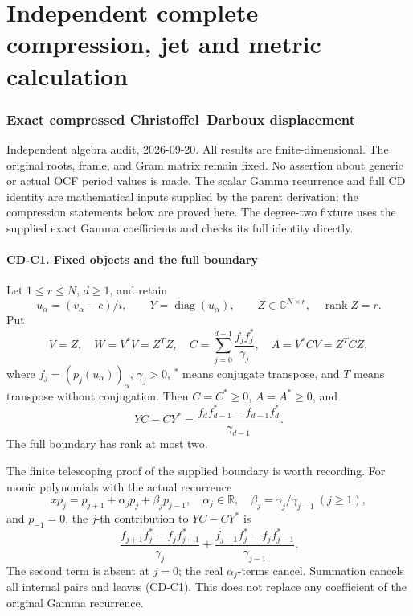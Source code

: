 \documentclass[11pt]{article}
\begin{document}
\endgroup

\clearpage\begingroup
\part*{Independent complete compression, jet and metric calculation}
\providecommand{\cdaudittightlist}{\setlength{\itemsep}{0pt}\setlength{\parskip}{0pt}}

\section{Exact compressed Christoffel--Darboux displacement}\label{cdaudit:exact-compressed-christoffeldarboux-displacement}

Independent algebra audit, 2026-09-20. All results are finite-dimensional. The original roots, frame, and Gram matrix remain fixed. No assertion about generic or actual OCF period values is made. The scalar Gamma recurrence and full CD identity are mathematical inputs supplied by the parent derivation; the compression statements below are proved here. The degree-two fixture uses the supplied exact Gamma coefficients and checks its full identity directly.

\subsection{CD-C1. Fixed objects and the full boundary}\label{cdaudit:cd-c1.-fixed-objects-and-the-full-boundary}

Let \(1\le r\le N\), \(d\ge1\), and retain \[
u_\alpha=(v_\alpha-c)/i,\qquad Y=\operatorname{diag}(u_\alpha),\qquad
Z\in\mathbb C^{N\times r},\quad \operatorname{rank}Z=r.
\] Put \[
V=\overline Z,\quad W=V^*V=Z^T\overline Z,\quad
C=\sum_{j=0}^{d-1}\frac{f_jf_j^*}{\gamma_j},\quad
A=V^*CV=Z^TC\overline Z,
\] where \(f_j=(p_j(u_\alpha))_\alpha\), \(\gamma_j>0\), \(^{*}\) means conjugate transpose, and \(T\) means transpose without conjugation. Then \(C=C^*\ge0\), \(A=A^*\ge0\), and \[
YC-CY^*=\frac{f_df_{d-1}^*-f_{d-1}f_d^*}{\gamma_{d-1}}.
\tag{CD-C1}
\] The full boundary has rank at most two.

The finite telescoping proof of the supplied boundary is worth recording. For monic polynomials with the actual recurrence \[
xp_j=p_{j+1}+\alpha_jp_j+\beta_jp_{j-1},\quad
\alpha_j\in\mathbb R,\quad \beta_j=\gamma_j/\gamma_{j-1}\ (j\ge1),
\] and \(p_{-1}=0\), the \(j\)-th contribution to \(YC-CY^*\) is \[
\frac{f_{j+1}f_j^*-f_jf_{j+1}^*}{\gamma_j}
+\frac{f_{j-1}f_j^*-f_jf_{j-1}^*}{\gamma_{j-1}}.
\] The second term is absent at \(j=0\); the real \(\alpha_j\)-terms cancel. Summation cancels all internal pairs and leaves (CD-C1). This does not replace any coefficient of the original Gamma recurrence.
\end{document}
